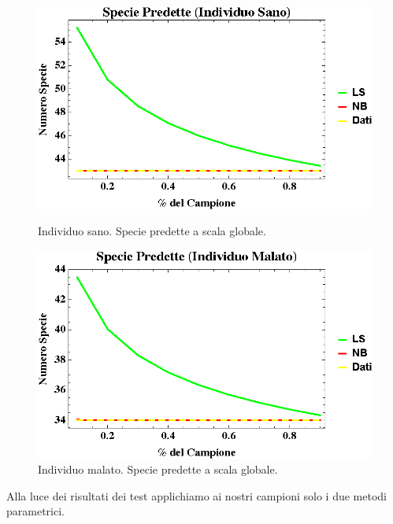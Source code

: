 \begin{figure}[H]
  \centering
    \begin{minipage}[b]{0.45\textwidth}
    \includegraphics[width=\textwidth]{Figure/cfrpredSpH.eps}
    \caption{Individuo sano. Specie predette a scala globale.}
    \label{fig:predSpH}
    \end{minipage}
\hfill
  \begin{minipage}[b]{0.45\textwidth}
    \includegraphics[width=\textwidth]{Figure/cfrpredSpC.eps}
\caption{Individuo malato. Specie predette a scala globale.}
\label{fig:predSpC}
\end{minipage}
\end{figure}

Alla luce dei risultati dei test applichiamo ai nostri campioni solo i due metodi parametrici.\newline



